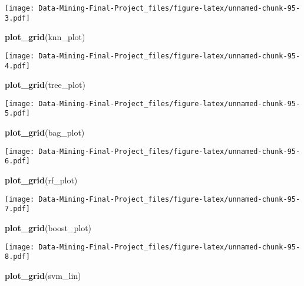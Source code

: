 \documentclass[
]{article}
\newenvironment{Shaded}{\begin{snugshade}}{\end{snugshade}}
\newcommand{\FunctionTok}[1]{\textcolor[rgb]{0.13,0.29,0.53}{\textbf{#1}}}
\newcommand{\NormalTok}[1]{#1}
\begin{document}
\texttt{[image: Data-Mining-Final-Project\_files/figure-latex/unnamed-chunk-95-3.pdf]}

\begin{Shaded}
\begin{Highlighting}[]
\FunctionTok{plot\_grid}\NormalTok{(knn\_plot)}
\end{Highlighting}
\end{Shaded}

\texttt{[image: Data-Mining-Final-Project\_files/figure-latex/unnamed-chunk-95-4.pdf]}

\begin{Shaded}
\begin{Highlighting}[]
\FunctionTok{plot\_grid}\NormalTok{(tree\_plot)}
\end{Highlighting}
\end{Shaded}

\texttt{[image: Data-Mining-Final-Project\_files/figure-latex/unnamed-chunk-95-5.pdf]}

\begin{Shaded}
\begin{Highlighting}[]
\FunctionTok{plot\_grid}\NormalTok{(bag\_plot)}
\end{Highlighting}
\end{Shaded}

\texttt{[image: Data-Mining-Final-Project\_files/figure-latex/unnamed-chunk-95-6.pdf]}

\begin{Shaded}
\begin{Highlighting}[]
\FunctionTok{plot\_grid}\NormalTok{(rf\_plot)}
\end{Highlighting}
\end{Shaded}

\texttt{[image: Data-Mining-Final-Project\_files/figure-latex/unnamed-chunk-95-7.pdf]}

\begin{Shaded}
\begin{Highlighting}[]
\FunctionTok{plot\_grid}\NormalTok{(boost\_plot)}
\end{Highlighting}
\end{Shaded}

\texttt{[image: Data-Mining-Final-Project\_files/figure-latex/unnamed-chunk-95-8.pdf]}

\begin{Shaded}
\begin{Highlighting}[]
\FunctionTok{plot\_grid}\NormalTok{(svm\_lin)}
\end{Highlighting}
\end{Shaded}
\end{document}

